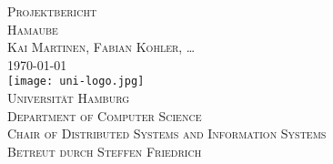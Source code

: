 \begin{titlepage}
\begin{center}
	\vspace{6em}
	{\Large \textsc{Projektbericht}}\\
	\vspace{5em}
	{\huge \textsc{Hamaube}}\\
	\vspace{4em}
	{\Large \textsc{Kai Martinen, Fabian Kohler, \dots}}\\
	\vspace{3em}
	{\Large \textsc{\today}}\\
	\vspace{3em}
	\texttt{[image: uni-logo.jpg]}\\
	\vspace{3em}
	{\Large \textsc{Universität Hamburg}}\\
	\vspace{1em}
	{\Large \textsc{Department of Computer Science}}\\
	\vspace{1em}
	{\Large \textsc{Chair of Distributed Systems and Information Systems}}\\
	\vspace{2em}
	{\Large \textsc{Betreut durch Steffen Friedrich}}\\
	
\end{center}
\end{titlepage}